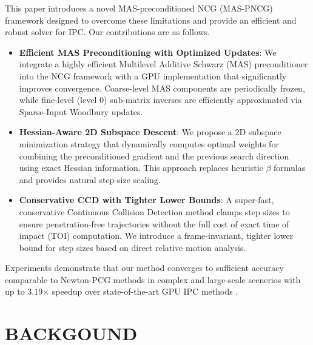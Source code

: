 \documentclass[acmtog,anonymous,review,screen,nonacm]{acmart}
\begin{document}
This paper introduces a novel MAS-preconditioned NCG (MAS-PNCG) framework designed to overcome these limitations and provide an efficient and robust solver for IPC. Our contributions are as follows.
\vspace{-5pt} 
\begin{itemize}
    \item \textbf{Efficient MAS Preconditioning with Optimized Updates}: We integrate a highly efficient Multilevel Additive Schwarz (MAS) preconditioner into the NCG framework with a GPU implementation that significantly improves convergence. Coarse-level MAS components are periodically frozen, while fine-level (level 0) sub-matrix inverses are efficiently approximated via Sparse-Input Woodbury updates.
    \item \textbf{Hessian-Aware 2D Subspace Descent}: We propose a 2D subspace minimization strategy that dynamically computes optimal weights for combining the preconditioned gradient and the previous search direction using exact Hessian information. This approach replaces heuristic $\beta$ formulas and provides natural step-size scaling.
    \item \textbf{Conservative CCD with Tighter Lower Bounds}: A super-fast, conservative Continuous Collision Detection method clamps step sizes to ensure penetration-free trajectories without the full cost of exact time of impact (TOI) computation. We introduce a frame-invariant, tighter lower bound for step sizes based on direct relative motion analysis.
\end{itemize}
\vspace{-5pt} 
Experiments demonstrate that our method converges to sufficient accuracy comparable to Newton-PCG methods in complex and large-scale scenerios with up to 3.19$\times$ speedup over state-of-the-art GPU IPC methods \cite{huang2024gipc}. %

\section{BACKGOUND}
\end{document}
